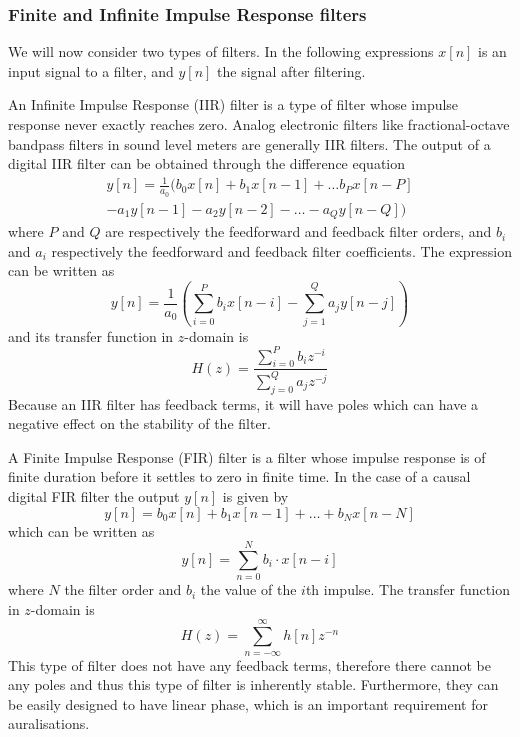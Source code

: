 

\subsubsection{Finite and Infinite Impulse Response filters}
We will now consider two types of filters. In the following expressions $x[n]$
is an input signal to a filter, and $y[n]$ the signal after filtering.

An Infinite Impulse Response (IIR) filter is a type of filter whose impulse
response never exactly reaches zero. Analog electronic filters like
fractional-octave bandpass filters in sound level meters are generally IIR
filters. The output of a digital IIR filter can be obtained through the
difference equation
\begin{multline}
 y[n] = \frac{1}{a_0} ( b_0 x[n] + b_1 x[n-1] + \dots b_P x[n-P] \\
      - a_1 y[n-1] - a_2 y[n-2] - \dots - a_Q y[n-Q] )
\end{multline}
where $P$ and $Q$ are respectively the feedforward and feedback filter orders,
and $b_i$ and $a_i$ respectively the feedforward and feedback filter
coefficients. The expression can be written as
\begin{equation}
 y[n] = \frac{1}{a_0} \left( \sum_{i=0}^{P} b_i x[n-i] - \sum_{j=1}^Q a_j y[n-j] \right)
\end{equation}
and its transfer function in $z$-domain is
\begin{equation}
 H(z) = \frac{\sum_{i=0}^P b_i z^{-i}}{\sum_{j=0}^Q a_j z^{-j}}
\end{equation}
Because an IIR filter has feedback terms, it will have poles which can have a
negative effect on the stability of the filter.

A Finite Impulse Response (FIR) filter is a filter whose impulse response is of
finite duration before it settles to zero in finite time. In the case of a
causal digital FIR filter the output $y[n]$ is given by
\begin{equation}
 y[n] = b_0 x[n] + b_1 x[n-1] + \dots + b_N x[n-N]
\end{equation}
which can be written as
\begin{equation}
 y[n] = \sum_{n=0}^{N} b_i \cdot x[n-i]
\end{equation}
where $N$ the filter order and $b_i$ the value of the $i$th impulse.
The transfer function in $z$-domain is
\begin{equation}
H(z) = \sum_{n=-\infty}^{\infty} h[n] z^{-n}
\end{equation}
This type of filter does not have any feedback terms, therefore there cannot be
any poles and thus this type of filter is inherently stable. Furthermore, they
can be easily designed to have linear phase, which is an important requirement
for auralisations.

